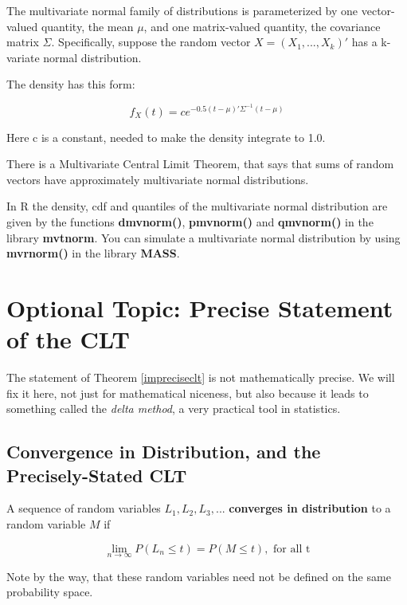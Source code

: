 The multivariate normal family of distributions is parameterized by one
vector-valued quantity, the mean $\mu$, and one matrix-valued quantity,
the covariance matrix $\Sigma$.  Specifically, suppose the random vector
$X = (X_1,...,X_k)'$ has a k-variate normal distribution.

The density has this form:

\begin{equation}
f_X(t) = c e^{-0.5 (t-\mu)'\Sigma^{-1}(t-\mu)}
\end{equation}

Here c is a constant, needed to make the density integrate to 1.0. 

There is a Multivariate Central Limit Theorem, that says that sums of
random vectors have approximately multivariate normal distributions.

In R the density, cdf and quantiles of the multivariate normal
distribution are given by the functions {\bf dmvnorm()}, {\bf pmvnorm()} 
and {\bf qmvnorm()} in the library {\bf mvtnorm}.  You can simulate a
multivariate normal distribution by using {\bf mvrnorm()} in the library
{\bf MASS}.

\section{Optional Topic:  Precise Statement of the CLT}
\label{formalclt}

The statement of Theorem \ref{impreciseclt} is not mathematically precise.
We will fix it here, not just for mathematical niceness, but also
because it leads to something called the {\it delta method}, a very
practical tool in statistics.

\subsection{Convergence in Distribution, and the Precisely-Stated CLT}

\begin{definition}
A sequence of random variables $L_1, L_2, L_3,...$ {\bf converges in
distribution} to a random variable $M$ if

\begin{equation}
\lim_{n \rightarrow \infty} P(L_n \leq t) = P(M \leq t), \textrm{ for
all t}
\end{equation}
\end{definition}

Note by the way, that these random variables need not be defined on the
same probability space.

